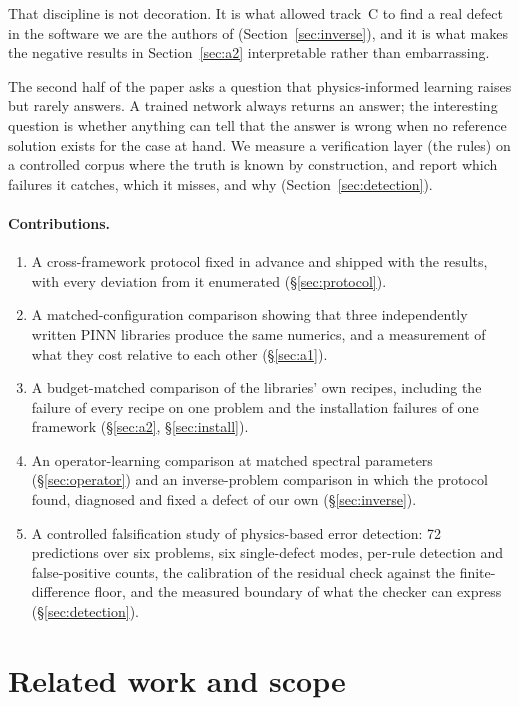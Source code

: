\documentclass[11pt]{article}
\newcommand{\code}[1]{\protect\path{#1}\xspace}
\begin{document}
That discipline is not decoration. It is what allowed track~C to find a real defect in the software
we are the authors of (Section~\ref{sec:inverse}), and it is what makes the negative results in
Section~\ref{sec:a2} interpretable rather than embarrassing.

The second half of the paper asks a question that physics-informed learning raises but rarely
answers. A trained network always returns an answer; the interesting question is whether anything
can tell that the answer is wrong when no reference solution exists for the case at hand. We measure
a verification layer (the \code{pinneapple check} rules) on a controlled corpus where the truth is
known by construction, and report which failures it catches, which it misses, and why
(Section~\ref{sec:detection}).

\paragraph{Contributions.}
\begin{enumerate}
  \item A cross-framework protocol fixed in advance and shipped with the results, with every
        deviation from it enumerated (\S\ref{sec:protocol}).
  \item A matched-configuration comparison showing that three independently written PINN libraries
        produce the same numerics, and a measurement of what they cost relative to each other
        (\S\ref{sec:a1}).
  \item A budget-matched comparison of the libraries' own recipes, including the failure of every
        recipe on one problem and the installation failures of one framework
        (\S\ref{sec:a2}, \S\ref{sec:install}).
  \item An operator-learning comparison at matched spectral parameters (\S\ref{sec:operator}) and an
        inverse-problem comparison in which the protocol found, diagnosed and fixed a defect of our
        own (\S\ref{sec:inverse}).
  \item A controlled falsification study of physics-based error detection: 72 predictions over six
        problems, six single-defect modes, per-rule detection and false-positive counts, the
        calibration of the residual check against the finite-difference floor, and the measured
        boundary of what the checker can express (\S\ref{sec:detection}).
\end{enumerate}

\section{Related work and scope}\label{sec:related}
\end{document}

